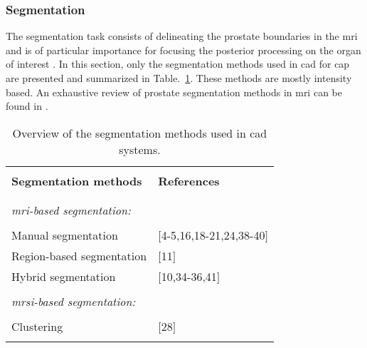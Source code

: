 \subsubsection{Segmentation}\label{subsubsec:chp3:lit-clas:img-reg:seg}
The segmentation task consists of delineating the prostate boundaries in the \ac{mri} and is of particular importance for focusing the posterior processing on the organ of interest \cite{Ghose2012}. 
In this section, only the segmentation methods used in \ac{cad} for \ac{cap} are presented and summarized in Table.~\ref{tab:summary-seg}.
These methods are mostly intensity based.
 An exhaustive review of prostate segmentation methods in \ac{mri} can be found in \cite{Ghose2012}.

\begin{table}
	\caption{Overview of the segmentation methods used in \ac{cad} systems.}
	\small
	\begin{tabular}{p{.65\linewidth} p{.25\linewidth}}
		\hline \\ [-1.5ex]
		\textbf{Segmentation methods} & \textbf{References} \\ \\ [-1.5ex]
		\hline \\ [-1.5ex]
		\textit{\ac{mri}-based segmentation:} & \\ \\ [-1.5ex]
		\quad Manual segmentation & $[$4-5,16,18-21,24,38-40$]$ \\
		\quad Region-based segmentation & $[$11$]$ \\
		\quad Hybrid segmentation & $[$10,34-36,41$]$ \\ \\ [-1.5ex]
		\textit{\ac{mrsi}-based segmentation:} & \\ \\ [-1.5ex]
		\quad Clustering & $[$28$]$ \\ \\ [-1.5ex]
		\hline
	\end{tabular}
\label{tab:summary-seg}
\end{table}

